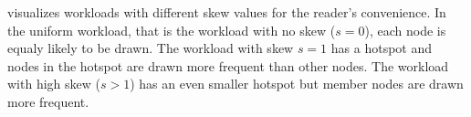 \documentclass[abstracton,12pt]{scrartcl}
\theoremstyle{definition}
\begin{document}
 visualizes workloads with different skew values for the
reader's convenience. In the uniform workload, that is the workload with no skew ($s=0$),
each node is equaly likely to be drawn. The workload with skew $s=1$ has a hotspot
and nodes in the hotspot are drawn more frequent than other nodes. The workload
with high skew ($s>1$) has an even smaller hotspot but member nodes are drawn more frequent.


\end{document}

